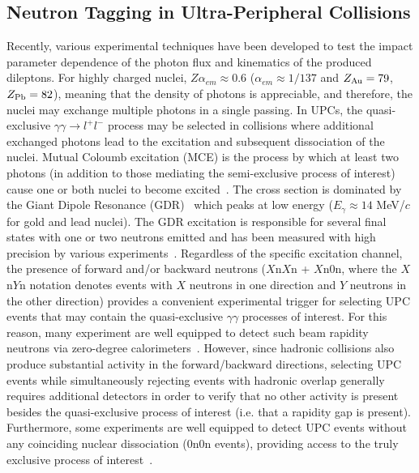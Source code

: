 \documentclass[twocolumn,epjc3]{svjour3}\sloppy
\begin{document}
\subsection{Neutron Tagging in Ultra-Peripheral Collisions}
Recently, various experimental techniques have been developed to test the impact parameter dependence of the photon flux and kinematics of the produced dileptons. 
For highly charged nuclei, $Z\alpha_{em} \approx 0.6$ ($\alpha_{em} \approx 1/137$ and $Z_{\rm{Au}} = 79$, $Z_{\rm{Pb}} = 82$), meaning that the density of photons is appreciable, and therefore, the nuclei may exchange multiple photons in a single passing.
In UPCs, the quasi-exclusive $\gamma\gamma \rightarrow l^+l^-$ process may be selected in collisions where additional exchanged photons lead to the excitation and subsequent dissociation of the nuclei. 
Mutual Coloumb excitation (MCE) is the process by which at least two photons (in addition to those mediating the semi-exclusive process of interest) cause one or both nuclei to become excited~\cite{stelsonCoulombExcitation1963}. 
The cross section is dominated by the Giant Dipole Resonance (GDR)~\cite{newtonObservationGiantDipole1981} which peaks at low energy ($E_\gamma\approx 14$ MeV/$c$ for gold and lead nuclei). 
The GDR excitation is responsible for several final states with one or two neutrons emitted and has been measured with high precision by various experiments~\cite{veyssierePhotoneutronCrossSections1970}.
Regardless of the specific excitation channel, the presence of forward and/or backward neutrons ($X$n$X$n + $X$n$0$n, where the $X$n$Y$n notation denotes events with $X$ neutrons in one direction and $Y$ neutrons in the other direction) provides a convenient experimental trigger for selecting UPC events that may contain the quasi-exclusive $\gamma\gamma$ processes of interest. 
For this reason, many experiment are well equipped to detect such beam rapidity neutrons via zero-degree calorimeters~\cite{adlerRHICZeroDegree2001b,arnaldiNeutronZeroDegree2006,grachovStatusZeroDegree2006,whiteATLASZeroDegree2010,golubevaNuclearnuclearCollisionCentrality2013}.
However, since hadronic collisions also produce substantial activity in the forward/backward directions, selecting UPC events while simultaneously rejecting events with hadronic overlap generally requires additional detectors in order to verify that no other activity is present besides the quasi-exclusive process of interest (i.e. that a rapidity gap is present). Furthermore, some experiments are well equipped to detect UPC events without any coinciding nuclear dissociation ($0$n$0$n events), providing access to the truly exclusive process of interest~\cite{atlascollaborationExclusiveDimuonProduction2020,cmscollaborationObservationForwardNeutron2020a}.  
\end{document}

